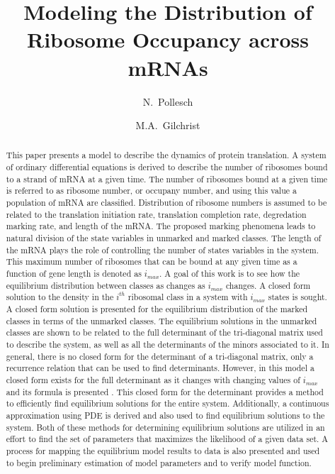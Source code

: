\documentclass[review]{elsarticle}
\begin{document}
\title{Modeling the Distribution of Ribosome Occupancy across mRNAs}
\author[utkm]{N.~Pollesch}
\author[utkeeb,nimbios]{M.A.~Gilchrist}
\address[utkm]{Department of Mathematics, University of Tennessee, 1403 Circle Drive, Knoxville, TN 37996-1320}
\address[utkeeb]{Department of Ecology and Evolutionary Biology, University of Tennessee, 569 Dabney Hall, Knoxville, TN 37996-1610}
\address[nimbios]{National Institute for Mathematical and Biological Synthesis, 1122 Volunteer Blvd., Suite 106, University of Tennessee, Knoxville, TN 37996-3410}

\begin{abstract}
This paper presents a model to describe the dynamics of protein translation.  
A system of ordinary differential equations is derived
to describe the number of ribosomes bound to a strand of mRNA at a
given time. The number of ribosomes bound at a given time is referred to as ribosome number, or occupany number, and using this value a population of mRNA are classified.  
Distribution of ribosome numbers is assumed to be related to the translation initiation rate, translation completion rate, degredation marking rate, and length of the mRNA.  The proposed marking phenomena leads to natural division of the state variables in unmarked and marked classes.
The length of the mRNA plays the role of controlling the number of states variables in the system.  
This maximum number of ribosomes that can be bound at any given time as a function of gene length
is denoted as $i_{max}$. A goal of this work is to see how the equilibrium
distribution between classes as changes as $i_{max}$ changes. A closed
form solution to the density in the $i^{th}$ ribosomal class in a system with
$i_{max}$ states is sought. A closed form solution is presented for the equilibrium distribution of the marked classes in terms of the unmarked classes. The equilibrium solutions in the unmarked classes
are shown to be related to the full determinant of the tri-diagonal
matrix used to describe the system, as well as all the determinants of the minors associated to
it. In general, there is no closed form for the determinant of a tri-diagonal
matrix, only a recurrence relation that can be used to find determinants.
However, in this model a closed form exists for the full determinant as it changes with changing values of $i_{max}$
and its formula is presented .  This closed form for the determinant provides a method to efficiently find equilibrium solutions for the entire system.  Additionally, a continuous approximation using PDE is derived and also used to find equilibrium solutions to the system.  Both of these methods for determining equilibrium solutions are utilized in an effort to find the set of parameters that maximizes the likelihood of a given data set.  A process for mapping the equilibrium model results to data is also presented and used to begin preliminary estimation of model parameters and to verify model function. 


\end{abstract}
\end{document}
